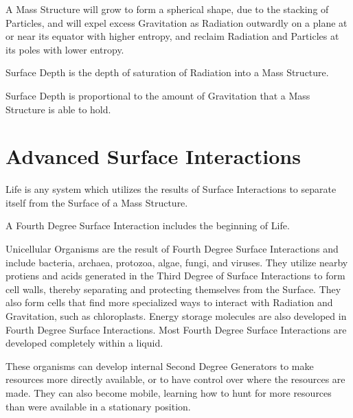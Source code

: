 \documentclass[12pt]{article}
\begin{document}
\begin{thm}
   A Mass Structure will grow to form a spherical shape, due to the stacking of Particles, and will expel excess Gravitation as Radiation outwardly on a plane at or near its equator with higher entropy, and reclaim Radiation and Particles at its poles with lower entropy.
\end{thm}


\begin{defn}
   Surface Depth is the depth of saturation of Radiation into a Mass Structure.
\end{defn}

\begin{thm}
  Surface Depth is proportional to the amount of Gravitation that a Mass Structure is able to hold.
\end{thm}





\newpage
\section*{Advanced Surface Interactions}

\begin{defn}
   Life is any system which utilizes the results of Surface Interactions to separate itself from the Surface of a Mass Structure.
\end{defn}

\begin{defn}
  A Fourth Degree Surface Interaction includes the beginning of Life.
\end{defn}

Unicellular Organisms are the result of Fourth Degree Surface Interactions and include bacteria, archaea, protozoa, algae, fungi, and viruses. They utilize nearby protiens and acids generated in the Third Degree of Surface Interactions to form cell walls, thereby separating and protecting themselves from the Surface. They also form cells that find more specialized ways to interact with Radiation and Gravitation, such as chloroplasts. Energy storage molecules are also developed in Fourth Degree Surface Interactions. Most Fourth Degree Surface Interactions are developed completely within a liquid.

These organisms can develop internal Second Degree Generators to make resources more directly available, or to have control over where the resources are made. They can also become mobile, learning how to hunt for more resources than were available in a stationary position.
\end{document}
